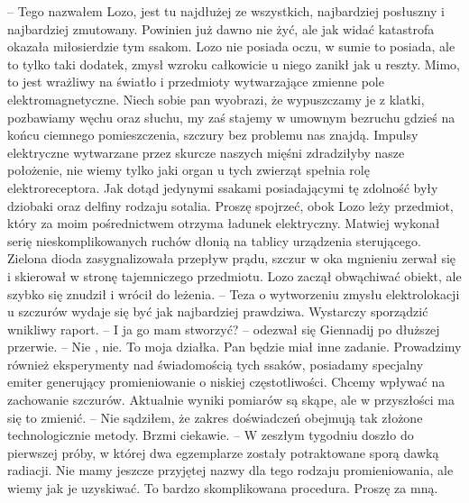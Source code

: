 \documentclass[../MAIN.tex]{subfiles}
\begin{document}
-- Tego nazwałem Lozo, jest tu najdłużej ze wszystkich, najbardziej posłuszny i najbardziej zmutowany. Powinien już dawno nie żyć, ale jak widać katastrofa okazała miłosierdzie tym ssakom. Lozo nie posiada oczu, w sumie to posiada, ale to tylko taki dodatek, zmysł wzroku całkowicie u niego zanikł jak u reszty. Mimo, to jest wrażliwy na światło i przedmioty wytwarzające zmienne pole elektromagnetyczne. Niech sobie pan wyobrazi, że wypuszczamy je z klatki, pozbawiamy węchu oraz słuchu, my zaś stajemy w umownym bezruchu gdzieś na końcu ciemnego pomieszczenia, szczury bez problemu nas znajdą. Impulsy elektryczne wytwarzane przez skurcze naszych mięśni zdradziłyby nasze położenie, nie wiemy tylko jaki organ u tych zwierząt spełnia rolę elektroreceptora. Jak dotąd jedynymi ssakami posiadającymi tę zdolność były dziobaki oraz delfiny rodzaju sotalia. Proszę spojrzeć, obok Lozo leży przedmiot, który za moim pośrednictwem otrzyma ładunek elektryczny. 
Matwiej wykonał serię nieskomplikowanych ruchów dłonią na tablicy urządzenia sterującego. Zielona dioda zasygnalizowała przepływ prądu, szczur w oka mgnieniu zerwał się i skierował w stronę tajemniczego przedmiotu. Lozo zaczął obwąchiwać obiekt, ale szybko się znudził i wrócił do leżenia. 
-- Teza o wytworzeniu zmysłu elektrolokacji u szczurów wydaje się być jak najbardziej prawdziwa. Wystarczy sporządzić wnikliwy raport. 
-- I ja go mam stworzyć? -- odezwał się Giennadij po dłuższej przerwie. 
-- Nie , nie. To moja działka. Pan będzie miał inne zadanie. Prowadzimy również eksperymenty nad świadomością tych ssaków, posiadamy specjalny emiter generujący promieniowanie o niskiej częstotliwości. Chcemy wpływać na zachowanie szczurów. Aktualnie wyniki pomiarów są skąpe, ale w przyszłości ma się to zmienić. 
-- Nie sądziłem, że zakres doświadczeń obejmują tak złożone technologicznie metody. Brzmi ciekawie. 
-- W zeszłym tygodniu doszło do pierwszej próby, w której dwa egzemplarze zostały potraktowane sporą dawką radiacji. Nie mamy jeszcze przyjętej nazwy dla tego rodzaju promieniowania, ale wiemy jak je uzyskiwać. To bardzo skomplikowana procedura. Proszę za mną. 
\end{document}
